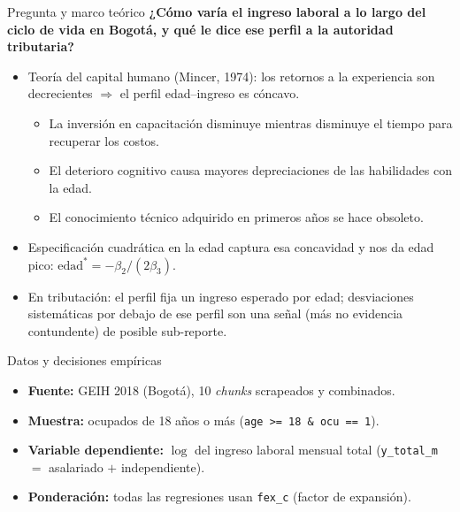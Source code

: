 \documentclass[aspectratio=169]{beamer}
\begin{document}
\begin{frame}{Pregunta y marco teórico}
  \textbf{¿Cómo varía el ingreso laboral a lo largo del ciclo de vida en Bogotá,
  y qué le dice ese perfil a la autoridad tributaria?}
  \vspace{0.6em}
  \begin{itemize}
    \item Teoría del capital humano (Mincer, 1974): los retornos a la experiencia son
      decrecientes $\Rightarrow$ el perfil edad--ingreso es cóncavo.
      \begin{itemize}
      \item La inversión en capacitación disminuye mientras disminuye el tiempo para recuperar los costos.
      \item El deterioro cognitivo causa mayores depreciaciones de las habilidades con la edad.
      \item El conocimiento técnico adquirido en primeros años se hace obsoleto.
      \end{itemize}
    \item Especificación cuadrática en la edad captura esa concavidad y nos da edad pico: $\text{edad}^\ast = -\beta_2 / (2\beta_3)$.
    \item En tributación: el perfil fija un ingreso esperado por edad; desviaciones
      sistemáticas por debajo de ese perfil son una señal (más no evidencia contundente) de posible sub-reporte.
  \end{itemize}
\end{frame}

\begin{frame}{Datos y decisiones empíricas}
  \begin{itemize}
    \item \textbf{Fuente:} GEIH 2018 (Bogotá), 10 \emph{chunks} scrapeados y combinados.
    \item \textbf{Muestra:} ocupados de 18 años o más (\texttt{age >= 18 \& ocu == 1}).
    \item \textbf{Variable dependiente:} $\log$ del ingreso laboral mensual total
      (\texttt{y\_total\_m} $=$ asalariado $+$ independiente).
    \item \textbf{Ponderación:} todas las regresiones usan \texttt{fex\_c}
      (factor de expansión).
  \end{itemize}
\end{frame}
\end{document}
